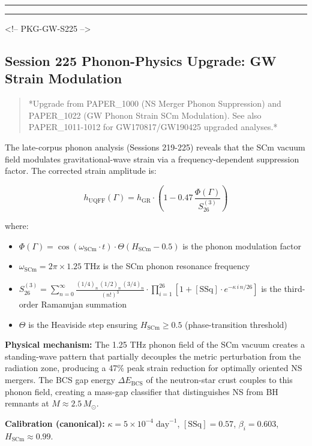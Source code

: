 \documentclass[11pt]{article}
\begin{document}
\noindent\rule{\textwidth}{0.4pt}

\noindent\rule{\textwidth}{0.4pt}

<!-- PKG-GW-S225 -->

\subsection*{Session 225 Phonon-Physics Upgrade: GW Strain Modulation}

\begin{quote}
*Upgrade from PAPER\_1000 (NS Merger Phonon Suppression) and PAPER\_1022
(GW Phonon Strain SCm Modulation). See also PAPER\_1011-1012 for
GW170817/GW190425 upgraded analyses.*
\end{quote}

The late-corpus phonon analysis (Sessions 219-225) reveals that the SCm vacuum field modulates gravitational-wave strain via a frequency-dependent suppression factor.  The corrected strain amplitude is:

$$h_{\text{UQFF}}(\Gamma) = h_{\text{GR}} \cdot \left(1 - 0.47\,\frac{\Phi(\Gamma)}{S_{26}^{(3)}}\right)$$

where:

\begin{itemize}
  \item $\Phi(\Gamma) = \cos(\omega_{\text{SCm}} \cdot t) \cdot \Theta(H_{\text{SCm}} - 0.5)$ is the phonon modulation factor
  \item $\omega_{\text{SCm}} = 2\pi \times 1.25\;\text{THz}$ is the SCm phonon resonance frequency
  \item $S_{26}^{(3)} = \sum_{n=0}^{\infty} \frac{(1/4)_n\,(1/2)_n\,(3/4)_n}{(n!)^3} \cdot \prod_{i=1}^{26}\left[1 + [\text{SSq}]\cdot e^{-\kappa\,i\,n/26}\right]$ is the third-order Ramanujan summation
  \item $\Theta$ is the Heaviside step ensuring $H_{\text{SCm}} \geq 0.5$ (phase-transition threshold)
\end{itemize}

\textbf{Physical mechanism:} The 1.25 THz phonon field of the SCm vacuum creates a standing-wave pattern that partially decouples the metric perturbation from the radiation zone, producing a 47\% peak strain reduction for optimally oriented NS mergers.  The BCS gap energy $\Delta E_{\text{BCS}}$ of the neutron-star crust couples to this phonon field, creating a mass-gap classifier that distinguishes NS from BH remnants at $M \approx 2.5\,M_\odot$.

\textbf{Calibration (canonical):} $\kappa = 5 \times 10^{-4}\;\text{day}^{-1}$, $[\text{SSq}] = 0.57$, $\beta_i = 0.603$, $H_{\text{SCm}} \approx 0.99$.
\end{document}
